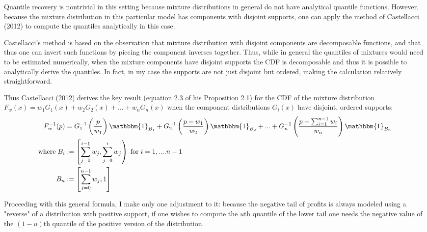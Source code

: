 \documentclass[AER]{AEA}
\begin{document}
 Quantile recovery is nontrivial in this setting because mixture distributions in general do not have analytical quantile functions. However, because the mixture distribution in this particular model has components with disjoint supports, one can apply the method of Castellacci (2012) to compute the quantiles analytically in this case.
 
Castellacci's method is based on the observation that mixture distribution with disjoint components are decomposable functions, and that thus one can invert such functions by piecing the component inverses together.  Thus, while in general the quantiles of mixtures would need to be estimated numerically, when the mixture components have disjoint supports the CDF is decomposable and thus it is possible to analytically derive the quantiles. In fact, in my case the supports are not just disjoint but ordered, making the calculation relatively straightforward. 

Thus Castellacci (2012) derives the key result (equation 2.3 of his Proposition 2.1) for the CDF of the mixture distribution $F_{w}(x) = w_1 G_1(x) + w_2 G_2 (x) + ... + w_n G_n (x)$ when the component distributions $G_i (x)$ have disjoint, ordered supports:
\begin{equation}
\begin{aligned}
F^{-1}_{w} (p) &= G_1^{-1}\left( \frac{p}{w_1} \right) \mathbbm{1}_{B_1}  +  G_2^{-1}\left( \frac{p - w_1}{w_2} \right) \mathbbm{1}_{B_2} + ... +  G_n^{-1}\left( \frac{p - \sum_{i=1}^{n-1} w_i}{w_n} \right) \mathbbm{1}_{B_n}\\
\text{where} \; B_{i} &:= \left[ \sum_{j=0}^{i-1} w_j, \sum_{j=0}^i w_j \right) \; \text{for} \; i = 1,....n-1 \\
B_n &:=  \left[ \sum_{j=0}^{n-1} w_j, 1\right]
\end{aligned}
\end{equation}

Proceeding with this general formula, I make only one adjustment to it: because the negative tail of profits is always modeled using a "reverse" of a distribution with positive support, if one wishes to compute the $u$th quantile of the lower tail one needs the negative value of the $(1-u)$th quantile of the positive version of the distribution. 
\end{document}
